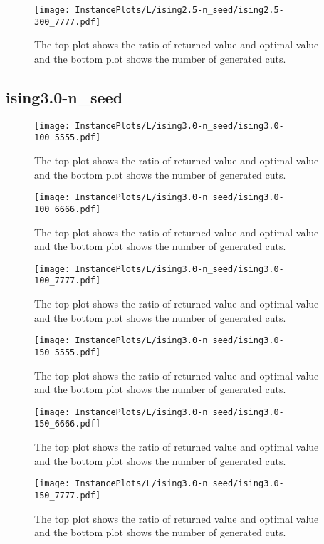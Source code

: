 \documentclass[10pt,a4paper]{article}
\begin{document}
\begin{figure}[H]
\texttt{[image: InstancePlots/L/ising2.5-n\_seed/ising2.5-300\_7777.pdf]}
\caption{The top plot shows the ratio of returned value and optimal value     and the bottom plot shows the number of generated cuts.}
\end{figure}

\subsection{ising3.0-n\_seed}
\begin{figure}[H]
\texttt{[image: InstancePlots/L/ising3.0-n\_seed/ising3.0-100\_5555.pdf]}
\caption{The top plot shows the ratio of returned value and optimal value     and the bottom plot shows the number of generated cuts.}
\end{figure}

\begin{figure}[H]
\texttt{[image: InstancePlots/L/ising3.0-n\_seed/ising3.0-100\_6666.pdf]}
\caption{The top plot shows the ratio of returned value and optimal value     and the bottom plot shows the number of generated cuts.}
\end{figure}

\begin{figure}[H]
\texttt{[image: InstancePlots/L/ising3.0-n\_seed/ising3.0-100\_7777.pdf]}
\caption{The top plot shows the ratio of returned value and optimal value     and the bottom plot shows the number of generated cuts.}
\end{figure}

\begin{figure}[H]
\texttt{[image: InstancePlots/L/ising3.0-n\_seed/ising3.0-150\_5555.pdf]}
\caption{The top plot shows the ratio of returned value and optimal value     and the bottom plot shows the number of generated cuts.}
\end{figure}

\begin{figure}[H]
\texttt{[image: InstancePlots/L/ising3.0-n\_seed/ising3.0-150\_6666.pdf]}
\caption{The top plot shows the ratio of returned value and optimal value     and the bottom plot shows the number of generated cuts.}
\end{figure}

\begin{figure}[H]
\texttt{[image: InstancePlots/L/ising3.0-n\_seed/ising3.0-150\_7777.pdf]}
\caption{The top plot shows the ratio of returned value and optimal value     and the bottom plot shows the number of generated cuts.}
\end{figure}
\end{document}
